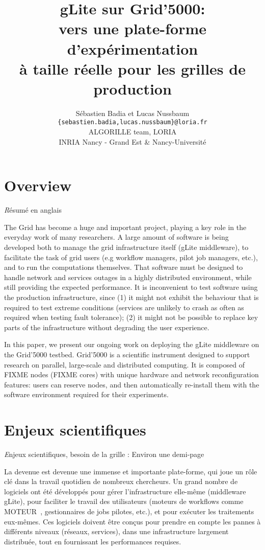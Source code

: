 \documentclass[a4paper,11pt]{article}
\title{gLite sur Grid'5000:\\ vers une plate-forme d'expérimentation\\ à taille réelle pour les grilles de production}
\date{}
\author{Sébastien Badia et Lucas Nussbaum\\
\texttt{\normalsize \{sebastien.badia,lucas.nussbaum\}@loria.fr}\\[1em]
\normalsize ALGORILLE team, LORIA\\
INRIA Nancy - Grand Est \& Nancy-Université}
\newcommand{\todo}[1]{{\color{red}\textsl #1}}
\begin{document}
\maketitle

\section{Overview}
\todo{Résumé en anglais}

The Grid has become a huge and important project, playing a key role in the
everyday work of many researchers. A large amount of software is being developed
both to manage the grid infrastructure itself (gLite middleware\cite{glite}),
to facilitate the task of grid users (e.g workflow managers\cite{moteur},
pilot job managers, etc.), and to run the computations themselves.
That software must be designed to handle network and services outages in a
highly distributed environment, while still providing the expected performance.
It is inconvenient to test software using the production infrastructure, since
(1) it might not exhibit the behaviour that is required to test extreme
conditions (services are unlikely to crash as often as required when testing
fault tolerance); (2) it might not be possible to replace key parts of the
infrastructure without degrading the user experience.

In this paper, we present our ongoing work on deploying the gLite middleware on
the Grid'5000 testbed. Grid'5000 is a scientific instrument designed to support
research on parallel, large-scale and distributed computing. It is composed of
FIXME nodes (FIXME cores) with unique hardware and network reconfiguration
features: users can reserve nodes, and then automatically re-install them with
the software environment required for their experiments.




\section{Enjeux scientifiques}
\todo{Enjeux scientifiques, besoin de la grille : Environ une demi-page}

La devenue est devenue une immense et importante plate-forme, qui joue un rôle
clé dans la travail quotidien de nombreux chercheurs. Un grand nombre de
logiciels ont été développés pour gérer l'infrastructure elle-même (middleware
gLite\cite{glite}), pour faciliter le travail des utilisateurs (moteurs de
workflows comme MOTEUR~\cite{moteur}, gestionnaires de jobs pilotes, etc.), et
pour exécuter les traitements eux-mêmes.
Ces logiciels doivent être conçus pour prendre en compte les pannes à
différents niveaux (réseaux, services), dans une infrastructure largement
distribuée, tout en fournissant les performances requises.
\end{document}
